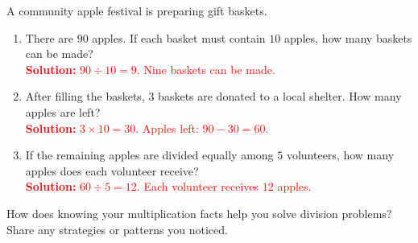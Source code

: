 \documentclass[12pt]{article}
\begin{document}
\vspace{1em}
\newpage
\begin{tcolorbox}[colframe=black!60, colback=white, 
coltitle=black, colbacktitle=black!15, fonttitle=\bfseries\Large, 
title=Performance Task: Organizing an Apple Festival, halign title=center, left=10pt, right=10pt, top=10pt, bottom=50pt]
A community apple festival is preparing gift baskets.

\begin{enumerate}[itemsep=5em]
    \item There are \(90\) apples. If each basket must contain \(10\) apples, how many baskets can be made?\\
    \textcolor{red}{\textbf{Solution:} \(90 \div 10 = 9\). Nine baskets can be made.}
    
    \item After filling the baskets, \(3\) baskets are donated to a local shelter. How many apples are left?\\
    \textcolor{red}{\textbf{Solution:} \(3 \times 10 = 30\). Apples left: \(90 - 30 = 60\).}
    
    \item If the remaining apples are divided equally among \(5\) volunteers, how many apples does each volunteer receive?\\
    \textcolor{red}{\textbf{Solution:} \(60 \div 5 = 12\). Each volunteer receives \(12\) apples.}
\end{enumerate}
\end{tcolorbox}

\vspace{1em}

\begin{tcolorbox}[colframe=black!60, colback=white, 
coltitle=black, colbacktitle=black!15, fonttitle=\bfseries\Large, 
title=Reflection, halign title=center, left=10pt, right=10pt, top=10pt, bottom=80pt]
How does knowing your multiplication facts help you solve division problems? Share any strategies or patterns you noticed.

\vspace{2cm}
\end{tcolorbox}
\end{document}
